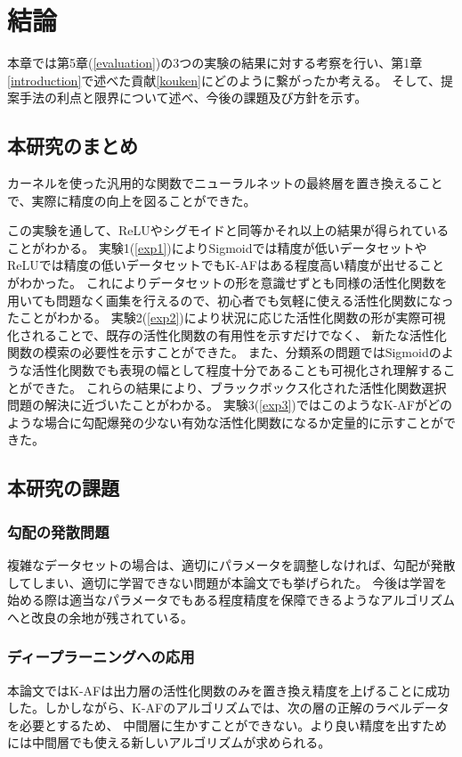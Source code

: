 \chapter{結論}
\label{conclusion}

本章では第5章(\ref{evaluation})の3つの実験の結果に対する考察を行い、第1章\ref{introduction}で述べた貢献\ref{kouken}にどのように繋がったか考える。
そして、提案手法の利点と限界について述べ、今後の課題及び方針を示す。


\section{本研究のまとめ}

カーネルを使った汎用的な関数でニューラルネットの最終層を置き換えることで、実際に精度の向上を図ることができた。

この実験を通して、ReLUやシグモイドと同等かそれ以上の結果が得られていることがわかる。
 実験1(\ref{exp1})によりSigmoidでは精度が低いデータセットやReLUでは精度の低いデータセットでもK-AFはある程度高い精度が出せることがわかった。
これによりデータセットの形を意識せずとも同様の活性化関数を用いても問題なく画集を行えるので、初心者でも気軽に使える活性化関数になったことがわかる。
 実験2(\ref{exp2})により状況に応じた活性化関数の形が実際可視化されることで、既存の活性化関数の有用性を示すだけでなく、
 新たな活性化関数の模索の必要性を示すことができた。
 また、分類系の問題ではSigmoidのような活性化関数でも表現の幅として程度十分であることも可視化され理解することができた。
これらの結果により、ブラックボックス化された活性化関数選択問題の解決に近づいたことがわかる。
 実験3(\ref{exp3})ではこのようなK-AFがどのような場合に勾配爆発の少ない有効な活性化関数になるか定量的に示すことができた。



\section{本研究の課題}

\subsection{勾配の発散問題}
複雑なデータセットの場合は、適切にパラメータを調整しなければ、勾配が発散してしまい、適切に学習できない問題が本論文でも挙げられた。
今後は学習を始める際は適当なパラメータでもある程度精度を保障できるようなアルゴリズムへと改良の余地が残されている。

\subsection{ディープラーニングへの応用}
本論文ではK-AFは出力層の活性化関数のみを置き換え精度を上げることに成功した。しかしながら、K-AFのアルゴリズムでは、次の層の正解のラベルデータを必要とするため、
中間層に生かすことができない。より良い精度を出すためには中間層でも使える新しいアルゴリズムが求められる。



